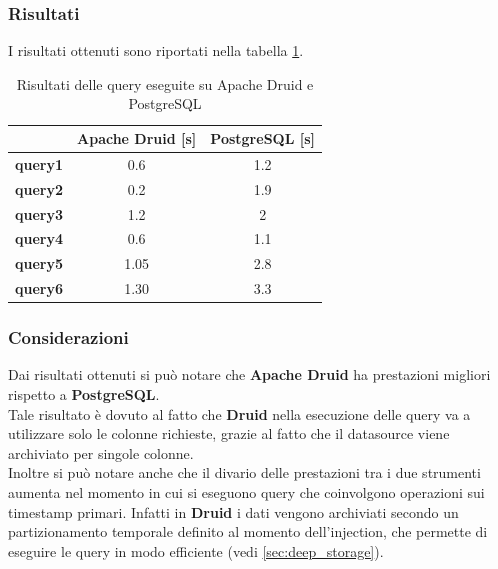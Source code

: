 \subsubsection{Risultati}
I risultati ottenuti sono riportati nella tabella \ref{tab:risultati_query}.
\begin{table}[h]
  \centering
  \caption{Risultati delle query eseguite su Apache Druid e PostgreSQL}
  \label{tab:risultati_query}
  \begin{tabular}{|c|c|c|}


\hline
& \textbf{Apache Druid [s]} &  \textbf{PostgreSQL [s]} \\\hline 

\textbf{query1} &    0.6 &  1.2 \\ \hline

\textbf{query2} &   0.2 &   1.9 \\ \hline 

\textbf{query3} &  1.2 &  2 \\ \hline
\textbf{query4} &  0.6 &  1.1 \\ \hline
\textbf{query5} &   1.05 &  2.8 \\ \hline
\textbf{query6} & 1.30 &  3.3 \\ \hline    
  \end{tabular}
\end{table}
\subsubsection{Considerazioni}
Dai risultati ottenuti si può notare che \textbf{Apache Druid} ha prestazioni migliori rispetto a \textbf{PostgreSQL}.\\
Tale risultato è dovuto al fatto che \textbf{Druid} nella esecuzione delle query va a utilizzare solo le colonne richieste, grazie al fatto che 
il \gls{datasource}{} viene archiviato per singole colonne.\\
Inoltre si può notare anche che il divario delle prestazioni tra i due strumenti aumenta nel momento 
in cui si eseguono query che coinvolgono operazioni sui timestamp primari.
Infatti in \textbf{Druid} i dati vengono archiviati secondo un partizionamento temporale definito 
al momento dell'\gls{injection}{}, che permette di eseguire le query in modo efficiente (vedi \ref{sec:deep_storage}).
\pagebreak
